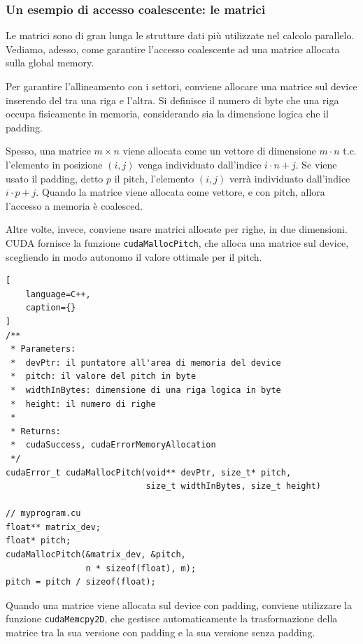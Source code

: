 \subsubsection{Un esempio di accesso coalescente: le matrici}
Le matrici sono di gran lunga le strutture dati più utilizzate nel calcolo parallelo. 
Vediamo, adesso, come garantire l'accesso coalescente ad una matrice allocata sulla global memory.

Per garantire l'allineamento con i settori, conviene allocare una matrice sul device inserendo del  tra una riga e l'altra.
Si definisce  il numero di byte che una riga occupa fisicamente in memoria, considerando sia la dimensione logica che il padding.

Spesso, una matrice \(m\times n\) viene allocata come un vettore di dimensione \(m\cdot n\) t.c. l'elemento in posizione \((i,j)\) venga individuato dall'indice \(i\cdot n + j\).
Se viene usato il padding, detto \(p\) il pitch, l'elemento \((i,j)\) verrà individuato dall'indice \(i\cdot p +j\).
Quando la matrice viene allocata come vettore, e con pitch, allora l'accesso a memoria è coalesced.

Altre volte, invece, conviene usare matrici allocate per righe, in due dimensioni. 
CUDA fornisce la funzione \texttt{cudaMallocPitch}, che alloca una matrice sul device, scegliendo in modo autonomo il valore ottimale per il pitch.

\begin{lstlisting}[
    language=C++,
    caption={}
]
/**
 * Parameters:
 *  devPtr: il puntatore all'area di memoria del device
 *  pitch: il valore del pitch in byte
 *  widthInBytes: dimensione di una riga logica in byte
 *  height: il numero di righe
 * 
 * Returns:
 *  cudaSuccess, cudaErrorMemoryAllocation
 */
cudaError_t cudaMallocPitch(void** devPtr, size_t* pitch, 
                            size_t widthInBytes, size_t height)

// myprogram.cu
float** matrix_dev;
float* pitch;
cudaMallocPitch(&matrix_dev, &pitch, 
				n * sizeof(float), m);
pitch = pitch / sizeof(float);
\end{lstlisting}

Quando una matrice viene allocata sul device con padding, conviene utilizzare la funzione \texttt{cudaMemcpy2D}, che gestisce automaticamente la trasformazione della matrice tra la sua versione con padding e la sua versione senza padding.

